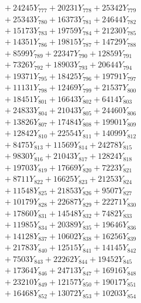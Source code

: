\documentclass[a4paper,10pt]{article}
\begin{document}
{\begin{align}
&\;  + 24245 Y_{777} + 20231 Y_{778} + 25342 Y_{779} \\[0.5ex]\allowbreak
&\;  + 25343 Y_{780} + 16373 Y_{781} + 24644 Y_{782} \\[0.3ex]
&\;  + 15173 Y_{783} + 19759 Y_{784} + 21230 Y_{785} \\[0.3ex]
&\;  + 14351 Y_{786} + 19815 Y_{787} + 14729 Y_{788} \\[0.3ex]
&\;  + 8599 Y_{789} + 22347 Y_{790} + 12859 Y_{791} \\[0.3ex]
&\;  + 7326 Y_{792} + 18903 Y_{793} + 20644 Y_{794} \\[0.3ex]
&\;  + 19371 Y_{795} + 18425 Y_{796} + 19791 Y_{797} \\[0.3ex]
&\;  + 11131 Y_{798} + 12469 Y_{799} + 21537 Y_{800} \\[0.3ex]
&\;  + 18451 Y_{801} + 16643 Y_{802} + 6414 Y_{803} \\[0.3ex]
&\;  + 24833 Y_{804} + 21043 Y_{805} + 24460 Y_{806} \\[0.3ex]
&\;  + 13826 Y_{807} + 17484 Y_{808} + 19901 Y_{809} \\[0.5ex]\allowbreak
&\;  + 12842 Y_{810} + 22554 Y_{811} + 14099 Y_{812} \\[0.3ex]
&\;  + 8475 Y_{813} + 11569 Y_{814} + 24278 Y_{815} \\[0.3ex]
&\;  + 9830 Y_{816} + 21043 Y_{817} + 12824 Y_{818} \\[0.3ex]
&\;  + 19703 Y_{819} + 17669 Y_{820} + 7223 Y_{821} \\[0.3ex]
&\;  + 8711 Y_{822} + 16625 Y_{823} + 21253 Y_{824} \\[0.3ex]
&\;  + 11548 Y_{825} + 21853 Y_{826} + 9507 Y_{827} \\[0.3ex]
&\;  + 10179 Y_{828} + 22687 Y_{829} + 22271 Y_{830} \\[0.3ex]
&\;  + 17860 Y_{831} + 14548 Y_{832} + 7482 Y_{833} \\[0.3ex]
&\;  + 11985 Y_{834} + 20389 Y_{835} + 19646 Y_{836} \\[0.3ex]
&\;  + 14128 Y_{837} + 10602 Y_{838} + 16256 Y_{839} \\[0.5ex]\allowbreak
&\;  + 21783 Y_{840} + 12515 Y_{841} + 14145 Y_{842} \\[0.3ex]
&\;  + 7503 Y_{843} + 22262 Y_{844} + 19452 Y_{845} \\[0.3ex]
&\;  + 17364 Y_{846} + 24713 Y_{847} + 16916 Y_{848} \\[0.3ex]
&\;  + 23210 Y_{849} + 12157 Y_{850} + 19017 Y_{851} \\[0.3ex]
&\;  + 16468 Y_{852} + 13072 Y_{853} + 10203 Y_{854} \\[0.3ex]

\end{align}}
\end{document}
